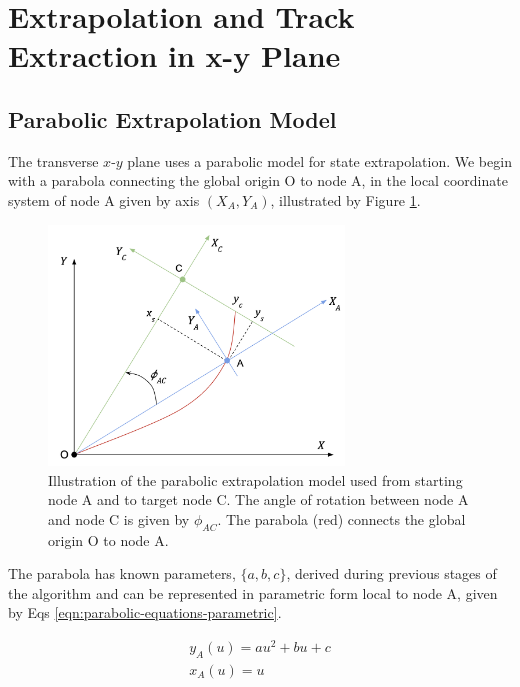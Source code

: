 \section{Extrapolation and Track Extraction in x-y Plane}
\label{chapter-6-x-y-plane-impl}

\subsection{Parabolic Extrapolation Model}

The transverse $x$-$y$ plane uses a parabolic model for state extrapolation. We begin with a parabola connecting the global origin O to node A, in the local coordinate system of node A given by axis $(X_A, Y_A)$, illustrated by Figure \ref{fig:trackml-parabolic-extrapolation-model-xy}.

\begin{figure}[htbp]
    \centering
    \includegraphics[width=0.7\textwidth]{images/6-trackml/extrapolation-model-xy-trackml-2.png}
    \caption{Illustration of the parabolic extrapolation model used from starting node A and to target node C. The angle of rotation between node A and node C is given by $\phi_{AC}$. The parabola (red) connects the global origin O to node A.}
    \label{fig:trackml-parabolic-extrapolation-model-xy}%
\end{figure}

The parabola has known parameters, $\{a, b, c\}$, derived during previous stages of the algorithm and can be represented in parametric form local to node A, given by Eqs \eqref{eqn:parabolic-equations-parametric}.

\begin{equation}
\begin{aligned}
y_A(u) = au^{2} + bu + c \\
x_A(u) = u
\end{aligned}
\label{eqn:parabolic-equations-parametric}
\end{equation}

